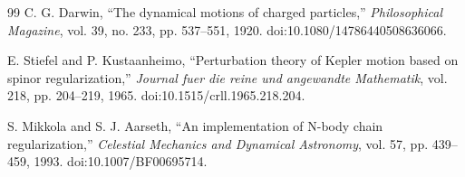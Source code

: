 \documentclass[11pt]{article}
\begin{document}
\begin{thebibliography}{99}
C. G. Darwin, ``The dynamical motions of charged particles,'' \emph{Philosophical Magazine}, vol. 39, no. 233, pp. 537--551, 1920. doi:10.1080/14786440508636066.

E. Stiefel and P. Kustaanheimo, ``Perturbation theory of Kepler motion based on spinor regularization,'' \emph{Journal fuer die reine und angewandte Mathematik}, vol. 218, pp. 204--219, 1965. doi:10.1515/crll.1965.218.204.

S. Mikkola and S. J. Aarseth, ``An implementation of N-body chain regularization,'' \emph{Celestial Mechanics and Dynamical Astronomy}, vol. 57, pp. 439--459, 1993. doi:10.1007/BF00695714.

\end{thebibliography}

\appendix
\end{document}
